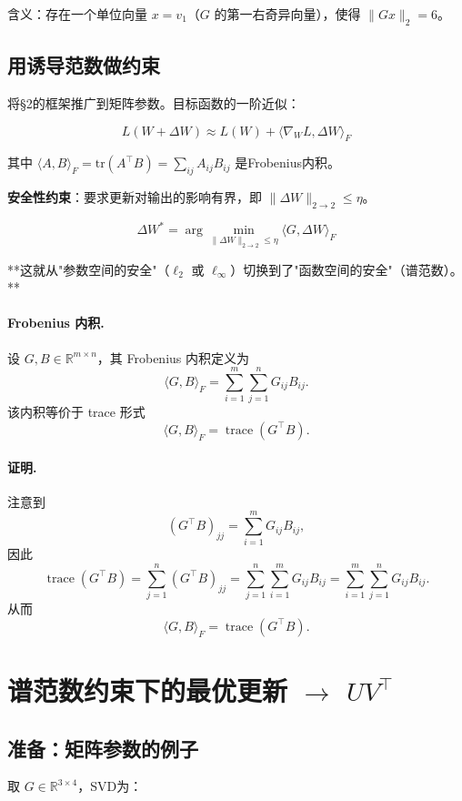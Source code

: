 \documentclass[12pt,a4paper]{article}
\begin{document}
含义：存在一个单位向量 $x = v_1$（$G$ 的第一右奇异向量），使得 $\|Gx\|_2 = 6$。


\subsection{用诱导范数做约束}

将§2的框架推广到矩阵参数。目标函数的一阶近似：


\[L(W + \Delta W) \approx L(W) + \langle \nabla_W L, \Delta W \rangle_F\]

其中 $\langle A, B \rangle_F = \text{tr}(A^\top B) = \sum_{ij} A_{ij}B_{ij}$ 是Frobenius内积。

\textbf{安全性约束}：要求更新对输出的影响有界，即 $\|\Delta W\|_{2 \to 2} \le \eta$。


\[\Delta W^* = \arg\min_{\|\Delta W\|_{2 \to 2} \le \eta} \langle G, \Delta W \rangle_F\]

**这就从"参数空间的安全"（$\ell_2$ 或 $\ell_\infty$）切换到了"函数空间的安全"（谱范数）。**


\paragraph{Frobenius 内积.}
设 $G, B \in \mathbb{R}^{m \times n}$，其 Frobenius 内积定义为
\[
\langle G, B \rangle_F
= \sum_{i=1}^{m} \sum_{j=1}^{n} G_{ij} B_{ij}.
\]
该内积等价于 trace 形式
\[
\langle G, B \rangle_F = \operatorname{trace}(G^\top B).
\]

\paragraph{证明.}
注意到
\[
(G^\top B)_{jj} = \sum_{i=1}^{m} G_{ij} B_{ij},
\]
因此
\[
\operatorname{trace}(G^\top B)
= \sum_{j=1}^{n} (G^\top B)_{jj}
= \sum_{j=1}^{n} \sum_{i=1}^{m} G_{ij} B_{ij}
= \sum_{i=1}^{m} \sum_{j=1}^{n} G_{ij} B_{ij}.
\]
从而
\[
\langle G, B \rangle_F = \operatorname{trace}(G^\top B).
\]



\section{谱范数约束下的最优更新 $\to$ $UV^\top$}


\subsection{准备：矩阵参数的例子}

取 $G \in \mathbb{R}^{3 \times 4}$，SVD为：
\end{document}
